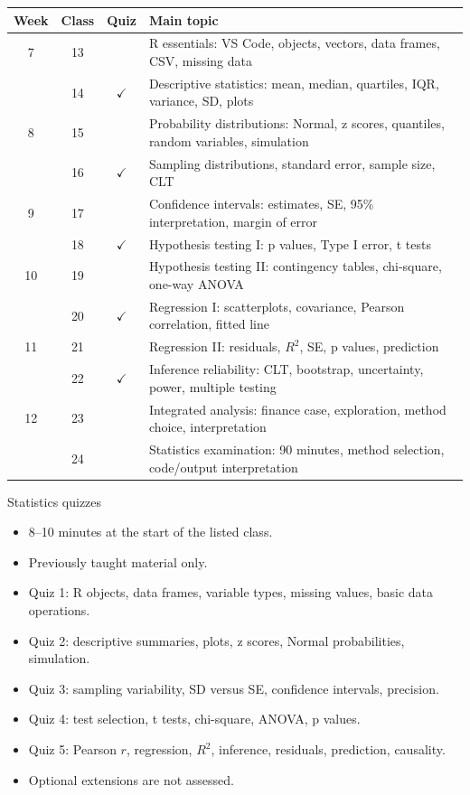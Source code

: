 \documentclass[aspectratio=169,11pt]{beamer}
\begin{document}

\begin{frame}
  \small
  \begin{tabular}{cccp{}}
    \toprule
    Week & Class & Quiz & Main topic \\
    \midrule
    7 & 13 & & R essentials: VS Code, objects, vectors, data frames, CSV, missing data \\
      & 14 & $\checkmark$ & Descriptive statistics: mean, median, quartiles, IQR, variance, SD, plots \\
    8 & 15 & & Probability distributions: Normal, z scores, quantiles, random variables, simulation \\
      & 16 & $\checkmark$ & Sampling distributions, standard error, sample size, CLT \\
    9 & 17 & & Confidence intervals: estimates, SE, 95\% interpretation, margin of error \\
      & 18 & $\checkmark$ & Hypothesis testing I: p values, Type I error, t tests \\
    10 & 19 & & Hypothesis testing II: contingency tables, chi-square, one-way ANOVA \\
       & 20 & $\checkmark$ & Regression I: scatterplots, covariance, Pearson correlation, fitted line \\
    11 & 21 & & Regression II: residuals, $R^2$, SE, p values, prediction \\
       & 22 & $\checkmark$ & Inference reliability: CLT, bootstrap, uncertainty, power, multiple testing \\
    12 & 23 & & Integrated analysis: finance case, exploration, method choice, interpretation \\
       & 24 & & Statistics examination: 90 minutes, method selection, code/output interpretation \\
    \bottomrule
  \end{tabular}
\end{frame}

\begin{frame}{Statistics quizzes}
  \begin{itemize}
    \item 8--10 minutes at the start of the listed class.
    \item Previously taught material only.
    \item Quiz 1: R objects, data frames, variable types, missing values, basic data operations.
    \item Quiz 2: descriptive summaries, plots, z scores, Normal probabilities, simulation.
    \item Quiz 3: sampling variability, SD versus SE, confidence intervals, precision.
    \item Quiz 4: test selection, t tests, chi-square, ANOVA, p values.
    \item Quiz 5: Pearson $r$, regression, $R^2$, inference, residuals, prediction, causality.
    \item Optional extensions are not assessed.
  \end{itemize}
\end{frame}
\end{document}
